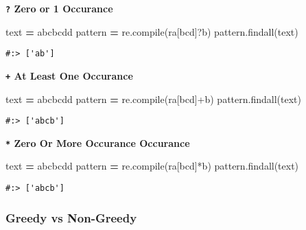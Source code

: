 \documentclass[
]{book}
\newenvironment{Shaded}{\begin{snugshade}}{\end{snugshade}}
\newcommand{\BuiltInTok}[1]{#1}
\newcommand{\NormalTok}[1]{#1}
\newcommand{\OperatorTok}[1]{\textcolor[rgb]{0.43,0.43,0.43}{\textbf{#1}}}
\newcommand{\StringTok}[1]{\textcolor[rgb]{0.5,0.5,0.5}{#1}}
\newcommand{\VerbatimStringTok}[1]{\textcolor[rgb]{0.5,0.5,0.5}{#1}}
\begin{document}
\textbf{\texttt{?} Zero or 1 Occurance}

\begin{Shaded}
\begin{Highlighting}[]
\NormalTok{text }\OperatorTok{=} \StringTok{\textquotesingle{}abcbcdd\textquotesingle{}}
\NormalTok{pattern }\OperatorTok{=}\NormalTok{ re.}\BuiltInTok{compile}\NormalTok{(}\VerbatimStringTok{r\textquotesingle{}a[bcd]?b\textquotesingle{}}\NormalTok{)}
\NormalTok{pattern.findall(text)}
\end{Highlighting}
\end{Shaded}

\begin{verbatim}
#:> ['ab']
\end{verbatim}

\textbf{\texttt{+} At Least One Occurance}

\begin{Shaded}
\begin{Highlighting}[]
\NormalTok{text }\OperatorTok{=} \StringTok{\textquotesingle{}abcbcdd\textquotesingle{}}
\NormalTok{pattern }\OperatorTok{=}\NormalTok{ re.}\BuiltInTok{compile}\NormalTok{(}\VerbatimStringTok{r\textquotesingle{}a[bcd]+b\textquotesingle{}}\NormalTok{)}
\NormalTok{pattern.findall(text)}
\end{Highlighting}
\end{Shaded}

\begin{verbatim}
#:> ['abcb']
\end{verbatim}

\textbf{\texttt{*} Zero Or More Occurance Occurance}

\begin{Shaded}
\begin{Highlighting}[]
\NormalTok{text }\OperatorTok{=} \StringTok{\textquotesingle{}abcbcdd\textquotesingle{}}
\NormalTok{pattern }\OperatorTok{=}\NormalTok{ re.}\BuiltInTok{compile}\NormalTok{(}\VerbatimStringTok{r\textquotesingle{}a[bcd]*b\textquotesingle{}}\NormalTok{)}
\NormalTok{pattern.findall(text)}
\end{Highlighting}
\end{Shaded}

\begin{verbatim}
#:> ['abcb']
\end{verbatim}

\hypertarget{greedy-vs-non-greedy}{%
\subsubsection{Greedy vs Non-Greedy}\label{greedy-vs-non-greedy}}
\end{document}
